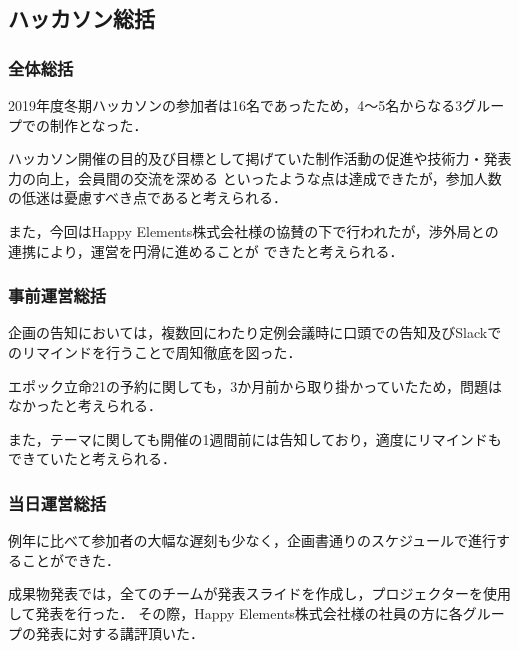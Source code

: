 \subsection*{ハッカソン総括}


\subsubsection*{全体総括}

2019年度冬期ハッカソンの参加者は16名であったため，4〜5名からなる3グループでの制作となった．

ハッカソン開催の目的及び目標として掲げていた制作活動の促進や技術力・発表力の向上，会員間の交流を深める
といったような点は達成できたが，参加人数の低迷は憂慮すべき点であると考えられる．

また，今回はHappy Elements株式会社様の協賛の下で行われたが，渉外局との連携により，運営を円滑に進めることが
できたと考えられる．

\subsubsection*{事前運営総括}

企画の告知においては，複数回にわたり定例会議時に口頭での告知及びSlackでのリマインドを行うことで周知徹底を図った．

エポック立命21の予約に関しても，3か月前から取り掛かっていたため，問題はなかったと考えられる．

また，テーマに関しても開催の1週間前には告知しており，適度にリマインドもできていたと考えられる．

\subsubsection*{当日運営総括}

例年に比べて参加者の大幅な遅刻も少なく，企画書通りのスケジュールで進行することができた．

成果物発表では，全てのチームが発表スライドを作成し，プロジェクターを使用して発表を行った．
その際，Happy Elements株式会社様の社員の方に各グループの発表に対する講評頂いた．


